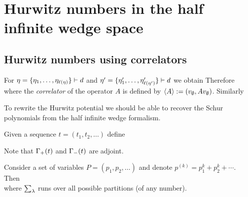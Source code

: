 \documentclass[10pt,handout]{beamer} %
\begin{document}
\section{Hurwitz numbers in the half infinite wedge space}

\subsection{Hurwitz numbers using correlators}

\begin{frame}

For $\eta=\{\eta_1,\ldots,\eta_{\ell(\eta)}\}\vdash d$ and $\eta'=\{\eta'_1,\ldots,\eta'_{\ell(\eta')}\}\vdash d$ we obtain
\pause
Therefore
where the \emph{correlator} of the operator $A$ is defined by $\langle A\rangle:=(v_\emptyset,Av_\emptyset)$. \pause Similarly

\end{frame}

\begin{frame}

To rewrite the Hurwitz potential we should be able to recover the Schur polynomials from the half infinite wedge formalism. \pause

\begin{definition}
Given a sequence $t=(t_1,t_2,\ldots)$ define
\end{definition}

Note that $\Gamma_+(t)$ and $\Gamma_-(t)$ are adjoint. \pause
\begin{lemma}
	Consider a set of variables $P=(p_1,p_2,\ldots)$ and denote $p^{(k)}=p_1^k+p_2^k+\cdots$. Then\\[-15pt]
	where $\sum_\lambda$ runs over all possible partitions (of any number).
\end{lemma}

\end{frame}
\end{document}
